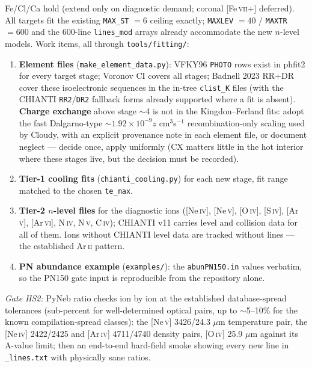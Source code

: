 \documentclass[english,a4paper]{my_memo}
\newcommand{\code}[1]{\texttt{#1}}
\begin{document}
Fe/Cl/Ca hold (extend only on diagnostic demand; coronal
[Fe\,\textsc{vii}+] deferred).  All targets fit the existing
\code{MAX\_ST} $=6$ ceiling exactly; \code{MAXLEV} $=40$ /
\code{MAXTR} $=600$ and the 600-line \code{lines\_mod} arrays already
accommodate the new $n$-level models.  Work items, all through
\code{tools/fitting/}:

\begin{enumerate}[leftmargin=2em]
\item \textbf{Element files} (\code{make\_element\_data.py}): VFKY96
  \code{PHOTO} rows exist in phfit2 for every target stage; Voronov CI
  covers all stages; Badnell 2023 RR+DR cover these isoelectronic
  sequences in the in-tree \code{clist\_K} files (with the CHIANTI
  \code{RR2}/\code{DR2} fallback forms already supported where a fit is
  absent).  \textbf{Charge exchange} above stage $\sim$4 is not in the
  Kingdon--Ferland fits: adopt the fast Dalgarno-type
  $\sim1.92\times10^{-9}z$ cm$^3$s$^{-1}$ recombination-only scaling
  used by Cloudy, with an explicit provenance note in each element
  file, or document neglect --- decide once, apply uniformly (CX
  matters little in the hot interior where these stages live, but the
  decision must be recorded).
\item \textbf{Tier-1 cooling fits} (\code{chianti\_cooling.py}) for
  each new stage, fit range matched to the chosen \code{te\_max}.
\item \textbf{Tier-2 $n$-level files} for the diagnostic ions
  ([Ne\,\textsc{iv}], [Ne\,\textsc{v}], [O\,\textsc{iv}],
  [S\,\textsc{iv}], [Ar\,\textsc{v}], [Ar\,\textsc{vi}], N\,\textsc{iv},
  N\,\textsc{v}, C\,\textsc{iv}); CHIANTI v11 carries level and
  collision data for all of them.  Ions without CHIANTI level data are
  tracked without lines --- the established Ar\,\textsc{ii} pattern.
\item \textbf{PN abundance example} (\code{examples/}): the
  \code{abunPN150.in} values verbatim, so the PN150 gate input is
  reproducible from the repository alone.
\end{enumerate}

\emph{Gate HS2:} PyNeb ratio checks ion by ion at the established
database-spread tolerances (sub-percent for well-determined optical
pairs, up to $\sim$5--10\% for the known compilation-spread classes):
the [Ne\,\textsc{v}] 3426/24.3 $\mu$m temperature pair, the
[Ne\,\textsc{iv}] 2422/2425 and [Ar\,\textsc{iv}] 4711/4740 density
pairs, [O\,\textsc{iv}] 25.9 $\mu$m against its A-value limit; then an
end-to-end hard-field smoke showing every new line in
\code{\_lines.txt} with physically sane ratios.
\end{document}
